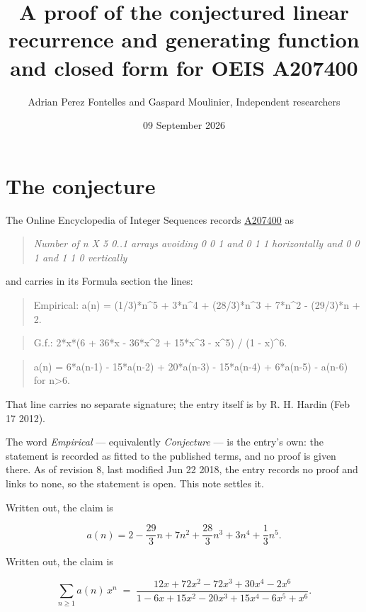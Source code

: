 \documentclass[11pt]{article}
\title{A proof of the conjectured linear recurrence and generating function and closed form for OEIS A207400}
\author{Adrian Perez Fontelles and Gaspard Moulinier, Independent researchers}
\date{09 September 2026}
\theoremstyle{definition}
\begin{document}
\maketitle
\section{The conjecture}

The Online Encyclopedia of Integer Sequences records \href{https://oeis.org/A207400}{A207400} as

\begin{quote}\itshape Number of n X 5 0..1 arrays avoiding 0 0 1 and 0 1 1 horizontally and 0 0 1 and 1 1 0 vertically\end{quote}

and carries in its Formula section the lines:

\begin{quote}\ttfamily Empirical: a(n) = (1/3)*n\textasciicircum{}5 + 3*n\textasciicircum{}4 + (28/3)*n\textasciicircum{}3 + 7*n\textasciicircum{}2 - (29/3)*n + 2.\end{quote}

\begin{quote}\ttfamily G.f.: 2*x*(6 + 36*x - 36*x\textasciicircum{}2 + 15*x\textasciicircum{}3 - x\textasciicircum{}5) / (1 - x)\textasciicircum{}6.\end{quote}

\begin{quote}\ttfamily a(n) = 6*a(n-1) - 15*a(n-2) + 20*a(n-3) - 15*a(n-4) + 6*a(n-5) - a(n-6) for n>6.\end{quote}

That line carries no separate signature; the entry itself is by R. H. Hardin (Feb 17 2012).

The word {\itshape Empirical} --- equivalently {\itshape Conjecture} --- is the entry's own: the statement is recorded as fitted to the published terms, and no proof is given there. As of revision 8, last modified Jun 22 2018, the entry records no proof and links to none, so the statement is open. This note settles it.

Written out, the claim is

\[a(n) = 2 - \frac{29}{3}n + 7n^{2} + \frac{28}{3}n^{3} + 3n^{4} + \frac{1}{3}n^{5}.\]

Written out, the claim is

\[\sum_{n \ge 1} a(n)\,x^n \;=\; \frac{12x + 72x^{2} - 72x^{3} + 30x^{4} - 2x^{6}}{1 - 6x + 15x^{2} - 20x^{3} + 15x^{4} - 6x^{5} + x^{6}}.\]
\end{document}
